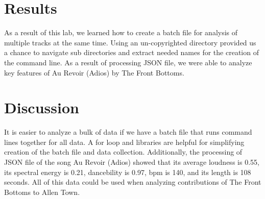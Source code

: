 \documentclass{article}\usepackage[]{graphicx}\usepackage[]{xcolor}
\begin{document}
\begin{multicols}{2}
\section{Results}
As a result of this lab, we learned how to create a batch file for analysis of multiple tracks at the same time. Using an un-copyrighted directory provided us a chance to navigate sub directories and extract needed names for the creation of the command line. As a result of processing JSON file, we were able to analyze key features of Au Revoir (Adios) by The Front Bottoms. 
\columnbreak


\section{Discussion}
It is easier to analyze a bulk of data if we have a batch file that runs command lines together for all data. A for loop and libraries are helpful for simplifying creation of the batch file and data collection. Additionally, the processing of JSON file of the song Au Revoir (Adios) showed that its average loudness is 0.55, its spectral energy is 0.21, dancebility is 0.97, bpm is 140, and its length is 108 seconds. All of this data could be used when analyzing contributions of The Front Bottoms to Allen Town.

\vspace{2em}


\begin{tiny}

\end{tiny}
\end{multicols}

\newpage
\onecolumn
\end{document}
